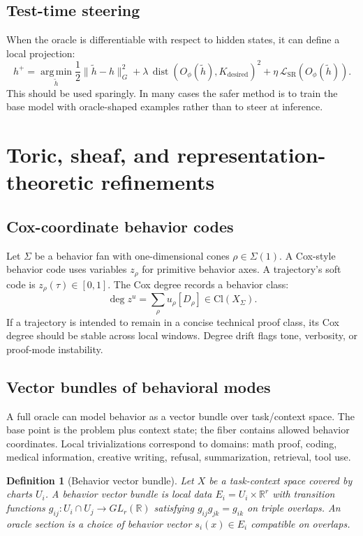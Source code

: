 \documentclass[11pt]{article}
\newtheorem{definition}[theorem]{Definition}
\newcommand{\RR}{\mathbb{R}}
\newcommand{\dist}{\operatorname{dist}}
\newcommand{\argmin}{\operatorname*{arg\,min}}
\newcommand{\loss}{\mathcal{L}}
\numberwithin{equation}{section}
\begin{document}
\subsection{Test-time steering}
When the oracle is differentiable with respect to hidden states, it can define a local projection:
\begin{equation}
h^+=\argmin_{\tilde h}\frac12\|\tilde h-h\|_G^2+\lambda\,\dist(O_\phi(\tilde h),K_{\mathrm{desired}})^2+\eta\,\loss_{\mathrm{SR}}(O_\phi(\tilde h)).
\end{equation}
This should be used sparingly. In many cases the safer method is to train the base model with oracle-shaped examples rather than to steer at inference.

\section{Toric, sheaf, and representation-theoretic refinements}
\subsection{Cox-coordinate behavior codes}
Let $\Sigma$ be a behavior fan with one-dimensional cones $\rho\in\Sigma(1)$. A Cox-style behavior code uses variables $z_\rho$ for primitive behavior axes. A trajectory's soft code is $z_\rho(\tau)\in[0,1]$. The Cox degree records a behavior class:
\begin{equation}
\deg z^u = \sum_{\rho}u_\rho[D_\rho]\in \mathrm{Cl}(X_\Sigma).
\end{equation}
If a trajectory is intended to remain in a concise technical proof class, its Cox degree should be stable across local windows. Degree drift flags tone, verbosity, or proof-mode instability.

\subsection{Vector bundles of behavioral modes}
A full oracle can model behavior as a vector bundle over task/context space. The base point is the problem plus context state; the fiber contains allowed behavior coordinates. Local trivializations correspond to domains: math proof, coding, medical information, creative writing, refusal, summarization, retrieval, tool use.

\begin{definition}[Behavior vector bundle]
Let $X$ be a task-context space covered by charts $U_i$. A behavior vector bundle is local data $E_i=U_i\times\RR^r$ with transition functions $g_{ij}:U_i\cap U_j\to GL_r(\RR)$ satisfying $g_{ij}g_{jk}=g_{ik}$ on triple overlaps. An oracle section is a choice of behavior vector $s_i(x)\in E_i$ compatible on overlaps.
\end{definition}
\end{document}
